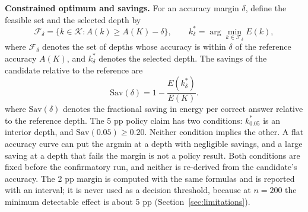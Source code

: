 \documentclass[a4paper,fleqn]{cas-sc}
\begin{document}
\textbf{Constrained optimum and savings.} For an accuracy margin $\delta$, define the feasible set and the selected depth by
\begin{equation}\label{eq:optimum}
  \mathcal{F}_{\delta}=\{k\in\mathcal{K}: A(k)\ge A(K)-\delta\},
  \qquad
  k^{*}_{\delta}=\arg\min_{k\in\mathcal{F}_{\delta}} E(k),
\end{equation}
where $\mathcal{F}_{\delta}$ denotes the set of depths whose accuracy is within $\delta$ of the reference accuracy $A(K)$, and $k^{*}_{\delta}$ denotes the selected depth. The savings of the candidate relative to the reference are
\begin{equation}\label{eq:savings}
  \mathrm{Sav}(\delta)=1-\frac{E(k^{*}_{\delta})}{E(K)} .
\end{equation}
where $\mathrm{Sav}(\delta)$ denotes the fractional saving in energy per correct answer relative to the reference depth. The 5 pp policy claim has two conditions: $k^{*}_{0.05}$ is an interior depth, and $\mathrm{Sav}(0.05)\ge 0.20$. Neither condition implies the other. A flat accuracy curve can put the argmin at a depth with negligible savings, and a large saving at a depth that fails the margin is not a policy result. Both conditions are fixed before the confirmatory run, and neither is re-derived from the candidate's accuracy. The 2 pp margin is computed with the same formulas and is reported with an interval; it is never used as a decision threshold, because at $n=200$ the minimum detectable effect is about 5 pp (Section~\ref{sec:limitations}).
\end{document}
